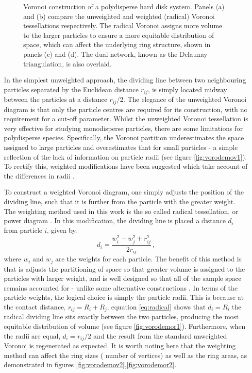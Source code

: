 \begin{figure}[bt]
     \caption{Voronoi construction of a polydisperse hard disk system. Panels (a) and (b) compare the unweighted and weighted (radical) Voronoi tessellations respectively. The radical Voronoi assigns more volume to the larger particles to ensure a more equitable distribution of space, which can affect the underlying ring structure, shown in panels (c) and (d). The dual network, known as the Delaunay triangulation, is also overlaid.}
     \label{fig:vorodemo}
\end{figure}

In the simplest unweighted approach, the dividing line between two neighbouring particles separated by the Euclidean distance $r_{ij}$, is simply located midway between the particles at a distance $r_{ij} /2$. 
The elegance of the unweighted Voronoi diagram is that only the particle centres are required for its construction, with no requirement for a cut\--off parameter. 
Whilst the unweighted Voronoi tessellation is very effective for studying monodisperse particles, there are some limitations for polydisperse species. 
Specifically, the Voronoi partition underestimates the space assigned to large particles and overestimates that for small particles \-- a simple reflection of the lack of information on particle radii  (see figure \ref{fig:vorodemov1}). 
To rectify this, weighted modifications have been suggested which take account of the differences in radii \cite{Poupon2004}.

To construct a weighted Voronoi diagram, one simply adjusts the position of the dividing line, such that it is further from the particle with the greater weight. 
The weighting method used in this work is the so called radical tessellation, or power diagram \cite{GELLATLY1982,Aurenhammer1987}. In this modification, the dividing line is placed a distance $d_i$ from particle $i$, given by:
\begin{equation}
	\label{eq:radical}
	d_i = \frac{w_i^2-w_j^2+r_{ij}^2}{2r_{ij}}\,,
\end{equation}
where $w_i$ and $w_j$ are the weights for each particle. 
The benefit of this method is that is adjusts the partitioning of space so that greater volume is assigned to the particles with larger weight, and is well designed so that all of the sample space remains accounted for \-- unlike some alternative constructions \cite{Richards1974}. 
In terms of the particle weights, the logical choice is simply the particle radii. 
This is because at the contact distance, $r_{ij} = R_i + R_j$, equation \eqref{eq:radical} shows that $d_i = R_i$ \ie{} the radical dividing line sits exactly between the two particles, producing the most equitable distribution of volume (see figure \ref{fig:vorodemor1}). 
Furthermore, when the radii are equal, $d_i = r_{ij} /2$ and the result from the standard unweighted Voronoi is regenerated as expected.
It is worth noting here that the weighting method can affect the ring sizes (\ie{} number of vertices) as well as the ring areas, as demonstrated in figures \ref{fig:vorodemov2},\ref{fig:vorodemor2}.

